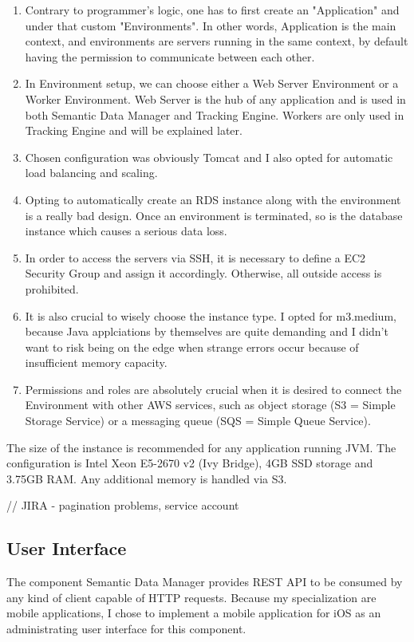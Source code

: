 \begin{enumerate}
	\item Contrary to programmer's logic, one has to first create an "Application" and under that custom "Environments". In other words, Application is the main context, and environments are servers running in the same context, by default having the permission to communicate between each other.
	\item In Environment setup, we can choose either a Web Server Environment or a Worker Environment. Web Server is the hub of any application and is used in both Semantic Data Manager and Tracking Engine. Workers are only used in Tracking Engine and will be explained later.
	\item Chosen configuration was obviously Tomcat and I also opted for automatic load balancing and scaling.
	\item Opting to automatically create an RDS instance along with the environment is a really bad design. Once an environment is terminated, so is the database instance which causes a serious data loss.
	\item In order to access the servers via SSH, it is necessary to define a EC2 Security Group and assign it accordingly. Otherwise, all outside access is prohibited.
	\item It is also crucial to wisely choose the instance type. I opted for m3.medium, because Java applciations by themselves are quite demanding and I didn't want to risk being on the edge when strange errors occur because of insufficient memory capacity.
	\item Permissions and roles are absolutely crucial when it is desired to connect the Environment with other AWS services, such as object storage (S3 = Simple Storage Service) or a messaging queue (SQS = Simple Queue Service).
\end{enumerate}

 The size of the instance is recommended for any application running JVM. The configuration is Intel Xeon E5-2670 v2 (Ivy Bridge), 4GB SSD storage and 3.75GB RAM. Any additional memory is handled via S3.

// JIRA - pagination problems, service account

\subsection{User Interface}

The component Semantic Data Manager provides REST API to be consumed by any kind of client capable of HTTP requests. Because my specialization are mobile applications, I chose to implement a mobile application for iOS as an administrating user interface for this component.

